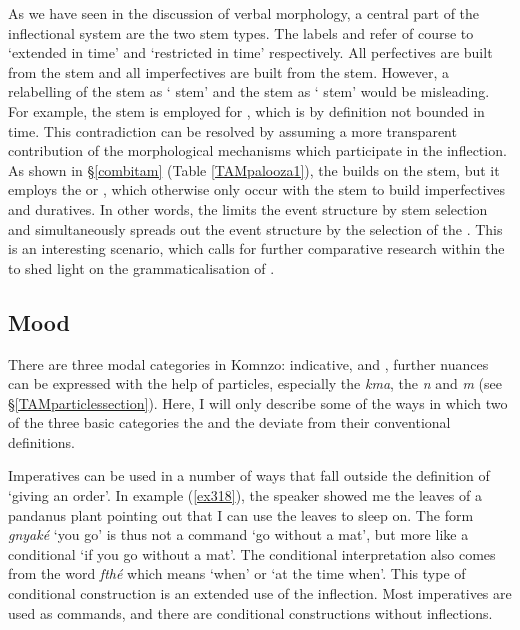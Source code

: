 As we have seen in the discussion of verbal morphology, a central part of the inflectional system are the two stem types. The labels \Ext{} and \Rs{} refer of course to `extended in time' and `restricted in time' respectively. All perfectives are built from the \Rs{} stem and all imperfectives are built from the \Ext{} stem. However, a relabelling of the \Rs{} stem as ` stem' and the \Ext{} stem as ` stem' would be misleading. For example, the \Rs{} stem is employed for  , which is by definition not bounded in time. This contradiction can be resolved by assuming a more transparent contribution of the morphological mechanisms which participate in the  inflection. As shown in \S{}\ref{combitam} (Table \ref{TAMpalooza1}), the  builds on the \Rs{} stem, but it employs the \Betaone{} or \Betatwo{} , which otherwise only occur with the \Ext{} stem to build imperfectives and duratives. In other words, the   limits the event structure by stem selection and simultaneously spreads out the event structure by the selection of the . This is an interesting scenario, which calls for further comparative research within the  to shed light on the grammaticalisation of  .

\subsection{Mood}\label{TAMsemmood}

There are three modal categories in Komnzo: indicative,  and , further nuances can be expressed with the help of particles, especially the  \emph{kma}, the  \emph{n} and  \emph{m} (see \S{}\ref{TAMparticlessection}). Here, I will only describe some of the ways in which two of the three basic categories \textendash{} the  and the  \textendash{} deviate from their conventional definitions.%

Imperatives can be used in a number of ways that fall outside the definition of `giving an order'. In example (\ref{ex318}), the speaker showed me the leaves of a pandanus plant pointing out that I can use the leaves to sleep on. The  form \emph{gnyaké} `you go' is thus not a command `go without a mat', but more like a conditional `if you go without a mat'. The conditional interpretation also comes from the word \emph{fthé} which means `when' or `at the time when'. This type of conditional construction is an extended use of the  inflection. Most imperatives are used as commands, and there are conditional constructions without  inflections.

